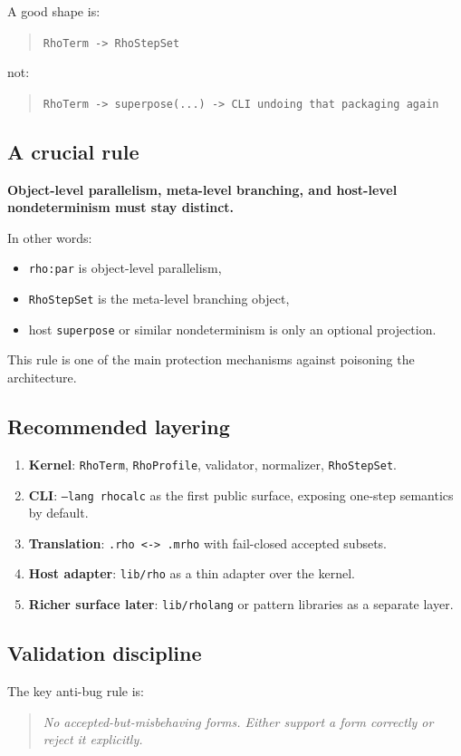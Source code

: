 \documentclass[11pt]{article}
\begin{document}
A good shape is:
\begin{quote}
\texttt{RhoTerm -> RhoStepSet}
\end{quote}
not:
\begin{quote}
\texttt{RhoTerm -> superpose(...) -> CLI undoing that packaging again}
\end{quote}

\subsection{A crucial rule}
\textbf{Object-level parallelism, meta-level branching, and host-level nondeterminism must stay distinct.}

In other words:
\begin{itemize}
  \item \texttt{rho:par} is object-level parallelism,
  \item \texttt{RhoStepSet} is the meta-level branching object,
  \item host \texttt{superpose} or similar nondeterminism is only an optional projection.
\end{itemize}

This rule is one of the main protection mechanisms against poisoning the architecture.

\subsection{Recommended layering}
\begin{enumerate}
  \item \textbf{Kernel}: \texttt{RhoTerm}, \texttt{RhoProfile}, validator, normalizer, \texttt{RhoStepSet}.
  \item \textbf{CLI}: \texttt{--lang rhocalc} as the first public surface, exposing one-step semantics by default.
  \item \textbf{Translation}: \texttt{.rho <-> .mrho} with fail-closed accepted subsets.
  \item \textbf{Host adapter}: \texttt{lib/rho} as a thin adapter over the kernel.
  \item \textbf{Richer surface later}: \texttt{lib/rholang} or pattern libraries as a separate layer.
\end{enumerate}

\subsection{Validation discipline}
The key anti-bug rule is:
\begin{quote}
\emph{No accepted-but-misbehaving forms. Either support a form correctly or reject it explicitly.}
\end{quote}
\end{document}
